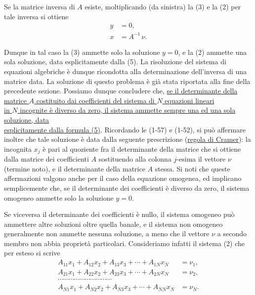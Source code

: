 \documentclass[11pt, a4paper]{book}
\numberwithin{equation}{section}
\begin{document}
Se la matrice inversa di $A$ esiste, moltiplicando (da sinistra) la (3) e
la (2) per tale inversa si ottiene
\begin{align}
y &= 0, \label{eq:3.2.4} \\
x &= A^{-1}\, \nu. \label{eq:3.2.5}
\end{align}

Dunque in tal caso la (3) ammette solo la soluzione $y = 0$, e la (2)
ammette una sola soluzione, data esplicitamente dalla (5). La risoluzione
del sistema di equazioni algebriche è dunque ricondotta alla determinazione
dell'inversa di una matrice data. La soluzione di questo problema è già
stata riportata alla fine della precedente sezione. Possiamo dunque
concludere che, \underline{se il determinante della matrice $A$ costituito
dai coefficienti del sistema di $N$ equazioni lineari} 
\\ \underline{in $N$ incognite è 
diverso da zero, il sistema ammette sempre una ed una sola soluzione, data} \\ \underline{
esplicitamente dalla formula (5)}. Ricordando le (1-57) e (1-52), si può
affermare inoltre che tale soluzione è data dalla seguente prescrizione
(\underline{regola di Cramer}): la incognita $x_j$ è pari al quoziente fra
il determinante della matrice che si ottiene dalla matrice dei coefficienti
$A$ sostituendo alla colonna $j$-esima il vettore $\nu$ (termine noto), e
il determinante della matrice $A$ stessa. Si noti che queste affermazioni
valgono anche per il caso della equazione omogenea, ed implicano
semplicemente che, se il determinante dei coefficienti è diverso da zero,
il sistema omogeneo ammette solo la soluzione $y = 0$.

Se viceversa il determinante dei coefficienti è nullo, il sistema omogeneo
può ammettere altre soluzioni oltre quella banale, e il sistema non
omogeneo generalmente non ammette nessuna soluzione, a meno che il vettore
$\nu$ a secondo membro non abbia proprietà particolari. Consideriamo
infatti il sistema (2) che per esteso si scrive
\begin{align*}
A_{11} x_1 + A_{12} x_2 + A_{13} x_3 + \cdots + A_{1N} x_N &= \nu_1, \\
A_{21} x_1 + A_{22} x_2 + A_{23} x_3 + \cdots + A_{2N} x_N &= \nu_2, \\
\cdots\cdots\cdots\cdots\cdots\cdots\cdots\cdots\cdots\cdots & \\
A_{N1} x_1 + A_{N2} x_2 + A_{N3} x_3 + \cdots + A_{NN} x_N &= \nu_N.
\tag{2}
\end{align*}
\end{document}
